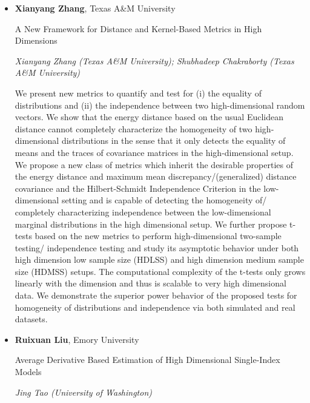 \begin{itemize}
\item \textbf{Xianyang Zhang}, Texas A\&M University

A New Framework for Distance and Kernel-Based Metrics in High Dimensions

\emph{\footnotesize Xianyang Zhang (Texas A\&M University); Shubhadeep Chakraborty (Texas A\&M University)}

We present new metrics to quantify and test for (i) the equality of distributions and (ii) the independence between two high-dimensional random vectors. We show that the energy distance based on the usual Euclidean distance cannot completely characterize the homogeneity of two high-dimensional distributions in the sense that it only detects the equality of means and the traces of covariance matrices in the high-dimensional setup. We propose a new class of metrics which inherit the desirable properties of the energy distance and maximum mean discrepancy/(generalized) distance covariance and the Hilbert-Schmidt Independence Criterion in the low-dimensional setting and is capable of detecting the homogeneity of/ completely characterizing independence between the low-dimensional marginal distributions in the high dimensional setup. We further propose t-tests based on the new metrics to perform high-dimensional two-sample testing/ independence testing and study its asymptotic behavior under both high dimension low sample size (HDLSS) and high dimension medium sample size (HDMSS) setups. The computational complexity of the t-tests only grows linearly with the dimension and thus is scalable to very high dimensional data. We demonstrate the superior power behavior of the proposed tests for homogeneity of distributions and independence via both simulated and real datasets.

\item \textbf{Ruixuan Liu}, Emory University

Average Derivative Based Estimation of High Dimensional Single-Index Models

\emph{\footnotesize Jing Tao (University of Washington)}


\end{itemize}
